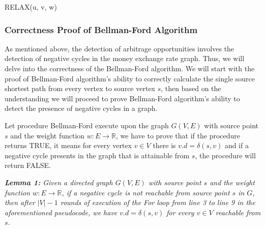 \documentclass[12pt]{article}
\begin{document}
\begin{algorithm}[H]
    \caption{RELAX(u, v, w)}
\end{algorithm}

\subsubsection{Correctness Proof of Bellman-Ford Algorithm}

As mentioned above, the detection of arbitrage opportunities involves the detection of negative cycles in the money exchange rate graph. Thus, we will delve into the correctness of the Bellman-Ford algorithm. We will start with the proof of  Bellman-Ford algorithm's ability to correctly calculate the single source shortest path from every vertex to source vertex $s$, then based on the understanding we will proceed to prove Bellman-Ford algorithm's ability to detect the presence of negative cycles in a graph.

\hspace*{\fill} %

Let procedure Bellman-Ford execute upon the graph $G(V, E)$ with source point $s$ and the weight function $w: E \rightarrow \mathbb{R}$, we have to prove that if the procedure returns TRUE, it means for every vertex $v \in V$ there is $v.d = \delta(s, v)$ and if a negative cycle presents in the graph that is attainable from $s$, the procedure will return FALSE.

\hspace*{\fill} %

\textit{\textbf{Lemma 1:}
Given a directed graph $G(V, E)$ with source point $s$ and the weight function $w:E \rightarrow \mathbb{R}$, if a negative cycle is not reachable from source point $s$ in $G$, then after $|V| - 1$ rounds of execution of the For loop from line 3 to line 9 in the aforementioned pseudocode, we have $v.d = \delta(s, v)$ for every $v \in V$ reachable from $s$.}

\hspace*{\fill} %
\end{document}
